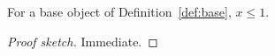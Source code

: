 
\begin{theorem}\label{thm:early}
For a base object of Definition~\ref{def:base}, $x \le 1$.
\end{theorem}

\begin{proof}[Proof sketch]
Immediate.
\end{proof}
